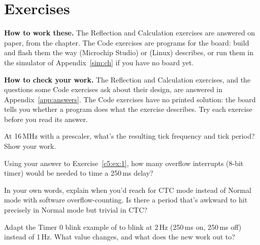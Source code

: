 
\section{Exercises}
\label{c5:sec:exercises}\label{c5:app:b}

\begin{aside}
\textbf{How to work these.} The Reflection and Calculation exercises are answered on paper, from
the chapter. The Code exercises are programs for the board: build and flash them the way
 (Microchip Studio) or  (Linux) describes, or run them in the
simulator of Appendix~\ref{sim:ch} if you have no board yet.

\textbf{How to check your work.} The Reflection and Calculation exercises, and the questions some
Code exercises ask about their design, are answered in Appendix~\ref{app:answers}. The Code
exercises have no printed solution: the board tells you whether a program does what the exercise
describes. Try each exercise before you read its answer.
\end{aside}

\label{c5:set:1}

\label{c5:ex:1}
At 16\,MHz with a  prescaler, what's the resulting tick frequency and tick period? Show
your work.

\label{c5:ex:2}
Using your answer to Exercise~\ref{c5:ex:1}, how many overflow interrupts (8-bit timer) would be
needed to time a 250\,ms delay?

\label{c5:set:2}

\label{c5:ex:3}
In your own words, explain when you'd reach for CTC mode instead of Normal mode with software
overflow-counting. Is there a period that's awkward to hit precisely in Normal mode but trivial in
CTC?

\label{c5:set:3}

\label{c5:ex:4}
Adapt the Timer 0 blink example of  to blink at 2\,Hz (250\,ms on, 250\,ms off)
instead of 1\,Hz. What value changes, and what does the new  work out to?

